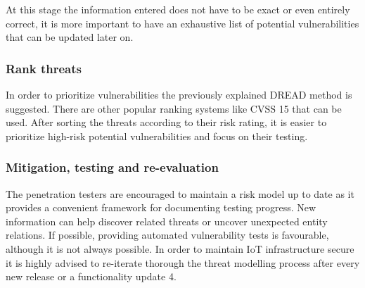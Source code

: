	At this stage the information entered does not have to be exact or even entirely correct, it is more important to have an exhaustive list of potential vulnerabilities that can be updated later on.
	
	\subsubsection{Rank threats}
	
	In order to prioritize vulnerabilities the previously explained DREAD method is suggested. There are other popular ranking systems like CVSS {15} that can be used. After sorting the threats according to their risk rating, it is easier to prioritize high-risk potential vulnerabilities and focus on their testing. 
	
	\subsubsection{Mitigation, testing and re-evaluation}
	
	The penetration testers are encouraged to maintain a risk model up to date as it provides a convenient framework for documenting testing progress. New information can help discover related threats or uncover unexpected entity relations. \newline
	If possible, providing automated vulnerability tests is favourable, although it is not always possible.
	In order to maintain IoT infrastructure secure it is highly advised to re-iterate thorough the threat modelling process after every new release or a functionality update {4}.
